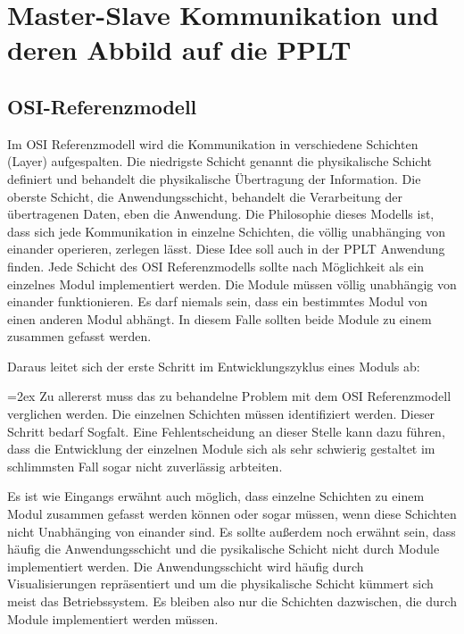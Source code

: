 \documentclass[a4paper,10pt]{book}
\newenvironment{merke}%
    {\begin{center}\bfseries\begin{Sbox}\begin{minipage}{10cm}\parskip=2ex}%
    {\end{minipage}\end{Sbox}\fbox{\TheSbox}\end{center}}
\begin{document}
\section{Master-Slave Kommunikation und deren Abbild auf die PPLT}    
    \subsection{OSI-Referenzmodell}
    \label{sec:th_osilayer}
    Im OSI Referenzmodell wird die Kommunikation in verschiedene Schichten 
    (Layer) aufgespalten. Die niedrigste Schicht genannt die physikalische 
    Schicht definiert und behandelt die physikalische Übertragung der 
    Information. Die oberste Schicht, die Anwendungsschicht, behandelt die
    Verarbeitung der übertragenen Daten, eben die Anwendung. Die Philosophie
    dieses Modells ist, dass sich jede Kommunikation in einzelne Schichten,
    die völlig unabhänging von einander operieren, zerlegen lässt. Diese Idee
    soll auch in der PPLT Anwendung finden. Jede Schicht des OSI 
    Referenzmodells sollte nach Möglichkeit als ein einzelnes Modul 
    implementiert werden. Die Module müssen völlig unabhängig von einander
    funktionieren. Es darf niemals sein, dass ein bestimmtes Modul von
    einen anderen Modul abhängt. In diesem Falle sollten beide Module
    zu einem zusammen gefasst werden.
    
    Daraus leitet sich der erste Schritt im Entwicklungszyklus eines Moduls ab:

    \begin{merke}
        Zu allererst muss das zu behandelne Problem mit dem OSI 
        Referenzmodell verglichen werden. Die einzelnen Schichten müssen 
        identifiziert werden. Dieser Schritt bedarf Sogfalt. Eine 
        Fehlentscheidung an dieser Stelle kann dazu führen, dass die 
        Entwicklung der einzelnen Module sich als sehr schwierig gestaltet 
        im schlimmsten Fall sogar nicht zuverlässig arbteiten.
    \end{merke}

    Es ist wie Eingangs erwähnt auch möglich, dass einzelne Schichten zu einem
    Modul zusammen gefasst werden können oder sogar müssen, wenn diese Schichten
    nicht Unabhänging von einander sind. Es sollte außerdem noch erwähnt sein,
    dass häufig die Anwendungsschicht und die pysikalische Schicht nicht durch 
    Module implementiert werden. Die Anwendungsschicht wird häufig durch 
    Visualisierungen repräsentiert und um die physikalische Schicht kümmert
    sich meist das Betriebssystem. Es bleiben also nur die Schichten 
    dazwischen, die durch Module implementiert werden müssen.
    
\end{document}
